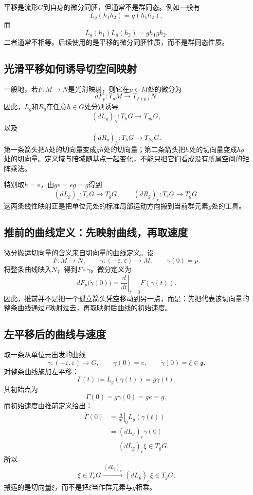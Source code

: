 \begin{remark}
平移是流形$G$到自身的微分同胚，但通常不是群同态。例如一般有
\[
    L_g(h_1h_2)=g(h_1h_2),
\]
而
\[
    L_g(h_1)L_g(h_2)=gh_1gh_2.
\]
二者通常不相等。后续使用的是平移的微分同胚性质，而不是群同态性质。
\end{remark}

\subsection{光滑平移如何诱导切空间映射}

一般地，若$F:M\to N$是光滑映射，则它在$p\in M$处的微分为
\[
    dF_p:T_pM\to T_{F(p)}N.
\]
因此，$L_g$和$R_g$在任意$h\in G$处分别诱导
\[
    \boxed{
    (dL_g)_h:T_hG\to T_{gh}G,
    }
\]
以及
\[
    \boxed{
    (dR_g)_h:T_hG\to T_{hg}G.
    }
\]
第一条箭头把$h$处的切向量变成$gh$处的切向量；第二条箭头把$h$处的切向量变成$hg$处的切向量。定义域与陪域随基点一起变化，不能只把它们看成没有所属空间的矩阵乘法。

特别取$h=e$，由$ge=eg=g$得到
\[
    \boxed{
    (dL_g)_e:T_eG\to T_gG,
    \qquad
    (dR_g)_e:T_eG\to T_gG.
    }
\]
这两条线性映射正是把单位元处的标准局部运动方向搬到当前群元素$g$处的工具。

\subsection{推前的曲线定义：先映射曲线，再取速度}

微分搬运切向量的含义来自切向量的曲线定义。设
\[
    F:M\to N,
    \qquad
    \gamma:(-\varepsilon,\varepsilon)\to M,
    \qquad
    \gamma(0)=p.
\]
将整条曲线映入$N$，得到$F\circ\gamma$。微分定义为
\[
    \boxed{
    dF_p\bigl(\dot\gamma(0)\bigr)
    =\left.\frac{d}{dt}\right|_{t=0}
    F(\gamma(t)).
    }
\]
因此，推前并不是把一个孤立箭头凭空移动到另一点，而是：先把代表该切向量的整条曲线通过$F$映射过去，再取映射后曲线的初始速度。

\subsection{左平移后的曲线与速度}

取一条从单位元出发的曲线
\[
    \gamma:(-\varepsilon,\varepsilon)\to G,
    \qquad
    \gamma(0)=e,
    \qquad
    \dot\gamma(0)=\xi\in\mathfrak g.
\]
对整条曲线施加左平移：
\[
    \Gamma(t)
    :=L_g(\gamma(t))
    =g\gamma(t).
\]
其初始点为
\[
    \Gamma(0)=g\gamma(0)=ge=g,
\]
而初始速度由推前定义给出：
\[
\begin{aligned}
    \dot\Gamma(0)
    &=\left.\frac{d}{dt}\right|_0L_g(\gamma(t))\\
    &=(dL_g)_e\dot\gamma(0)\\
    &=(dL_g)_e\xi\in T_gG.
\end{aligned}
\]
所以
\[
    \boxed{
    \xi\in T_eG
    \xrightarrow{\ (dL_g)_e\ }
    (dL_g)_e\xi\in T_gG.
    }
\]
搬运的是切向量$\xi$，而不是把$\xi$当作群元素与$g$相乘。

